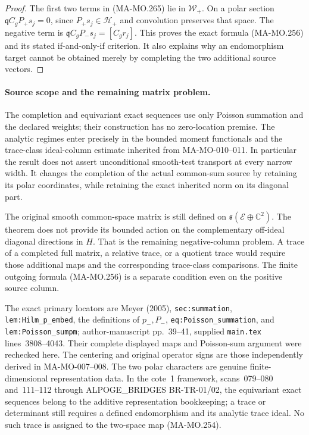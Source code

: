 \begin{proof}
The first two terms in (MA-MO.265) lie in \(\mathcal W_+\).
On a polar section \(\mathfrak q C_gP_+s_j=0\), since
\(P_+s_j\in\mathscr H_+\) and convolution preserves that
space. The negative term is
\(\mathfrak q C_gP_-s_j=[C_gr_j]\). This proves the
exact formula (MA-MO.256) and its stated if-and-only-if
criterion. It also explains why an endomorphism target
cannot be obtained merely by completing the two additional
source vectors.
\end{proof}

\paragraph{Source scope and the remaining matrix problem.}
The completion and equivariant exact sequences use only Poisson
summation and the declared weights; their construction has no
zero-location premise. The analytic regimes enter precisely in
the bounded moment functionals and the trace-class ideal-column
estimate inherited from MA-MO-010--011. In particular the result
does not assert unconditional smooth-test transport at every
narrow width. It changes the completion of the actual common-sum
source by retaining its polar coordinates, while retaining the
exact inherited norm on its diagonal part.

The original smooth common-space matrix is still defined on
\(\mathfrak s(\mathcal E\oplus\mathbb C^2)\). The theorem
does not provide its bounded action on the complementary
off-ideal diagonal directions in \(H\). That is the remaining
negative-column problem. A trace of a completed full matrix,
a relative trace, or a quotient trace would require those
additional maps and the corresponding trace-class comparisons.
The finite outgoing formula (MA-MO.256) is a separate condition
even on the positive source column.

The exact primary locators are Meyer (2005),
\texttt{sec:summation}, \texttt{lem:Hilm\_p\_embed}, the
definitions of \(p_-,P_-\), \texttt{eq:Poisson\_summation},
and \texttt{lem:Poisson\_sumpm}; author-manuscript
pp.~39--41, supplied \texttt{main.tex} lines~3808--4043.
Their complete displayed maps and Poisson-sum argument were
rechecked here. The centering and original operator signs are
those independently derived in MA-MO-007--008.
The two polar characters are genuine finite-dimensional
representation data. In the cote~1 framework, scans~079--080
and~111--112 through ALPOGE\_BRIDGES BR-TR-01/02, the
equivariant exact sequences belong to the additive
representation bookkeeping; a trace or determinant still
requires a defined endomorphism and its analytic trace ideal.
No such trace is assigned to the two-space map (MA-MO.254).

